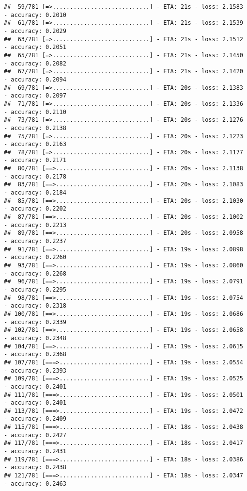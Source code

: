 \documentclass[
]{article}
\begin{document}
\begin{verbatim}
##  59/781 [=>............................] - ETA: 21s - loss: 2.1583 - accuracy: 0.2010
##  61/781 [=>............................] - ETA: 21s - loss: 2.1539 - accuracy: 0.2029
##  63/781 [=>............................] - ETA: 21s - loss: 2.1512 - accuracy: 0.2051
##  65/781 [=>............................] - ETA: 21s - loss: 2.1450 - accuracy: 0.2082
##  67/781 [=>............................] - ETA: 21s - loss: 2.1420 - accuracy: 0.2094
##  69/781 [=>............................] - ETA: 20s - loss: 2.1383 - accuracy: 0.2097
##  71/781 [=>............................] - ETA: 20s - loss: 2.1336 - accuracy: 0.2110
##  73/781 [=>............................] - ETA: 20s - loss: 2.1276 - accuracy: 0.2138
##  75/781 [=>............................] - ETA: 20s - loss: 2.1223 - accuracy: 0.2163
##  78/781 [=>............................] - ETA: 20s - loss: 2.1177 - accuracy: 0.2171
##  80/781 [==>...........................] - ETA: 20s - loss: 2.1138 - accuracy: 0.2178
##  83/781 [==>...........................] - ETA: 20s - loss: 2.1083 - accuracy: 0.2184
##  85/781 [==>...........................] - ETA: 20s - loss: 2.1030 - accuracy: 0.2202
##  87/781 [==>...........................] - ETA: 20s - loss: 2.1002 - accuracy: 0.2213
##  89/781 [==>...........................] - ETA: 20s - loss: 2.0958 - accuracy: 0.2237
##  91/781 [==>...........................] - ETA: 19s - loss: 2.0898 - accuracy: 0.2260
##  93/781 [==>...........................] - ETA: 19s - loss: 2.0860 - accuracy: 0.2268
##  96/781 [==>...........................] - ETA: 19s - loss: 2.0791 - accuracy: 0.2295
##  98/781 [==>...........................] - ETA: 19s - loss: 2.0754 - accuracy: 0.2318
## 100/781 [==>...........................] - ETA: 19s - loss: 2.0686 - accuracy: 0.2339
## 102/781 [==>...........................] - ETA: 19s - loss: 2.0658 - accuracy: 0.2348
## 104/781 [==>...........................] - ETA: 19s - loss: 2.0615 - accuracy: 0.2368
## 107/781 [===>..........................] - ETA: 19s - loss: 2.0554 - accuracy: 0.2393
## 109/781 [===>..........................] - ETA: 19s - loss: 2.0525 - accuracy: 0.2401
## 111/781 [===>..........................] - ETA: 19s - loss: 2.0501 - accuracy: 0.2401
## 113/781 [===>..........................] - ETA: 19s - loss: 2.0472 - accuracy: 0.2409
## 115/781 [===>..........................] - ETA: 18s - loss: 2.0438 - accuracy: 0.2427
## 117/781 [===>..........................] - ETA: 18s - loss: 2.0417 - accuracy: 0.2431
## 119/781 [===>..........................] - ETA: 18s - loss: 2.0386 - accuracy: 0.2438
## 121/781 [===>..........................] - ETA: 18s - loss: 2.0347 - accuracy: 0.2463

\end{verbatim}
\end{document}
